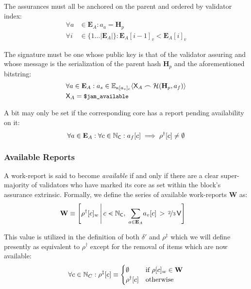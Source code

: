 The assurances must all be anchored on the parent and ordered by validator index:
\begin{align}
  \forall a &\in \mathbf{E}_A : a_a = \mathbf{H}_p \\
  \forall i &\in \{ 1\dots|\mathbf{E}_A| \} : \mathbf{E}_A[i - 1]_v < \mathbf{E}_A[i]_v
\end{align}

The signature must be one whose public key is that of the validator assuring and whose message is the serialization of the parent hash $\mathbf{H}_p$ and the aforementioned bitstring:
\begin{align}
  &\forall a \in \mathbf{E}_A : a_s \in \mathbb{E}_{\kappa[a_v]_e}\langle\mathsf{X}_A\frown \mathcal{H}(\mathbf{H}_p, a_f)\rangle \\
  &\mathsf{X}_A = \text{{\small \texttt{\$jam\_available}}}
\end{align}

A bit may only be set if the corresponding core has a report pending availability on it:
\begin{align}
  \forall a \in \mathbf{E}_A : \forall c \in \mathbb{N}_\mathsf{C} : a_f[c] \implies \rho^\dagger[c] \ne \emptyset
\end{align}

\subsubsection{Available Reports}
A work-report is said to become \emph{available} if and only if there are a clear  super-majority of validators who have marked its core as set within the block's assurance extrinsic. Formally, we define the series of available work-reports $\mathbf{W}$ as:
\begin{align}\label{eq:availableworkreports}
  \mathbf{W} &\equiv \left[\rho^\dagger[c]_w\,\middle\vert\,c \orderedin \N_\mathsf{C},\;\sum_{a \in \mathbf{E}_A}\!a_v[c]\,>\,\nicefrac{2}{3}\,\mathsf{V}\right]
\end{align}

This value is utilized in the definition of both $\delta'$ and $\rho^\ddagger$ which we will define presently as equivalent to $\rho^\dagger$ except for the removal of items which are now available:
\begin{align}
  \forall c \in \mathbb{N}_C: \rho^\ddagger[c] \equiv \begin{cases}
    \emptyset &\text{if }\rho[c]_w \in \mathbf{W}\\
    \rho^\dagger[c] &\text{otherwise}
  \end{cases}
\end{align}











